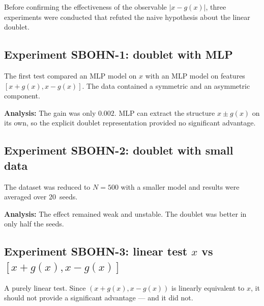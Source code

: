 \documentclass[11pt,a4paper]{report}
\begin{document}
Before confirming the effectiveness of the observable $|x-g(x)|$, three
experiments were conducted that refuted the naive hypothesis about the linear doublet.

\subsection{Experiment SBOHN-1: doublet with MLP}

The first test compared an MLP model on $x$ with an MLP model on features
$[x+g(x),x-g(x)]$. The data contained a symmetric and an asymmetric component.

\noindent{}


\noindent{}


\textbf{Analysis:} The gain was only $0.002$. MLP can extract the structure
$x\pm g(x)$ on its own, so the explicit doublet representation provided no significant advantage.

\subsection{Experiment SBOHN-2: doublet with small data}

The dataset was reduced to $N=500$ with a smaller model and results were averaged over 20~seeds.

\noindent{}


\noindent{}


\textbf{Analysis:} The effect remained weak and unstable. The doublet was better
in only half the seeds.

\subsection{Experiment SBOHN-3: linear test $x$ vs $[x+g(x),x-g(x)]$}

A purely linear test. Since $(x+g(x),x-g(x))$ is linearly equivalent to $x$,
it should not provide a significant advantage --- and it did not.
\end{document}
